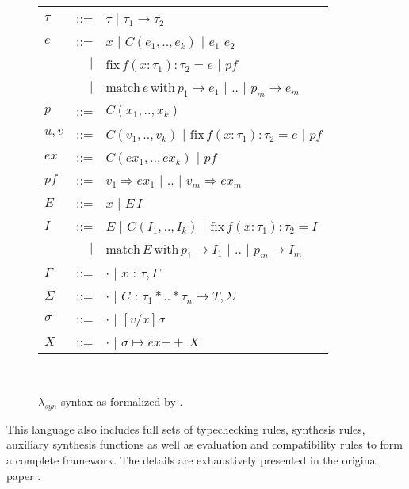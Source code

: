 \documentclass[preprint, 11pt]{sigplanconf}
\newcommand{\concat}{\ensuremath{+\!\!\!\!+\,}}
\begin{document}
\begin{figure}[!ht]
  \begin{center}
    \begin{tabular}{lrl}
            $\tau$    & ::=    & $\tau$ $\mid$ $\tau_{1} \rightarrow \tau_{2}$ \\
            $e$       & ::=    & $x$ $\mid$ $C(e_{1},..,e_{k})$ $\mid$ $e_{1}$ $e_{2}$ \\
                      & $\mid$ & $\mathrm{fix} \, f(x:\tau_{1}):\tau_{2}=e$ $\mid$ $pf$ \\
                      & $\mid$ & $\mathrm{match}\, e \, \mathrm{ with } \, p_{1} \rightarrow e_{1}$ $\mid$ .. $\mid$ $p_{m} \rightarrow e_{m}$ \\
            $p$       & ::=    & $C(x_{1},..,x_{k})$ \\
            $u,v$     & ::=    & $C(v_{1},..,v_{k})$ $\mid$ $\mathrm{fix} \, f(x:\tau_{1}):\tau_{2}=e$ $\mid$ $pf$ \\
            $ex$      & ::=    & $C(ex_{1},..,ex_{k})$ $\mid$ $pf$ \\
            $pf$      & ::=    & $v_{1} \Rightarrow ex_{1}$ $\mid$ .. $\mid$ $v_{m} \Rightarrow ex_{m}$ \\
            $E$       & ::=    & $x$ $\mid$ $E\,I$ \\
            $I$       & ::=    & $E$ $\mid$ $C(I_{1},..,I_{k})$ $\mid$ $\mathrm{fix} \, f(x:\tau_{1}):\tau_{2}=I$ \\
                      & $\mid$ & $\mathrm{match}\, E \, \mathrm{ with } \, p_{1} \rightarrow I_{1}$ $\mid$ .. $\mid$ $p_{m} \rightarrow I_{m}$ \\
            $\Gamma$  & ::= & $\cdot$ $\mid$ $x$ : $\tau,\Gamma$ \\
            $\Sigma$  & ::= & $\cdot$ $\mid$ $C$ : $\tau_{1} * .. * \tau_{n} \rightarrow T,\Sigma$ \\

            $\sigma$  & ::= & $\cdot$ $\mid$ $[v/x]\sigma$ \\
            $X$       & ::= & $\cdot$ $\mid$ $\sigma \mapsto ex \concat X$
    \end{tabular} \\
  \end{center}
  \caption{$\lambda_{syn}$ syntax as formalized by \citet{osera2015type}.}
  \label{fig-lambdasyn}
\end{figure}

This language also includes full sets of typechecking rules, synthesis rules, auxiliary synthesis functions as well as evaluation and compatibility rules to form a complete framework. The details are exhaustively presented in the original paper \cite{osera2015type}.\\
\end{document}
